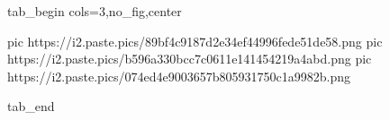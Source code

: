  
 
 
 
 


\ifcmt
  tab_begin cols=3,no_fig,center

     pic https://i2.paste.pics/89bf4c9187d2e34ef44996fede51de58.png
		 pic https://i2.paste.pics/b596a330bcc7c0611e141454219a4abd.png
		 pic https://i2.paste.pics/074ed4e9003657b805931750c1a9982b.png

  tab_end
\fi
